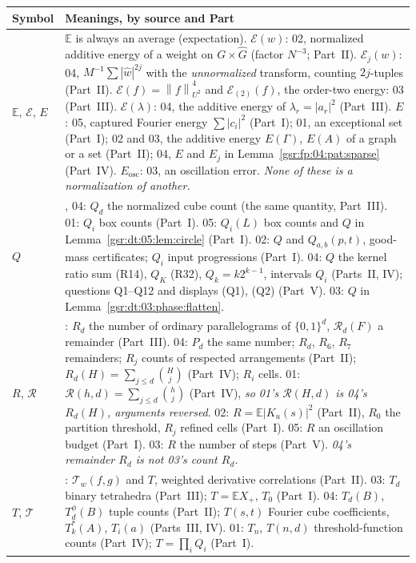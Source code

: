 \documentclass[11pt,letterpaper]{article}
\numberwithin{equation}{section}
\theoremstyle{definition}
\theoremstyle{remark}
\newcommand{\E}{\mathbb E}
\newcommand{\1}{\mathbf 1}
\newcommand{\norm}[1]{\left\|#1\right\|}
\newcommand{\calE}{\mathcal E}
\newcommand{\calT}{\mathcal T}
\begin{document}
\begingroup\small
\renewcommand{\theHtable}{notation.\arabic{table}}
\begin{longtable}{@{}>{\raggedright\arraybackslash}p{} >{\raggedright\arraybackslash}p{}@{}}
\toprule
Symbol & Meanings, by source and Part\\
\midrule
\endhead
$\E$, $\mathcal E$, $E$ & $\E$ is always an average (expectation). $\calE(w)$: 02, normalized additive energy of a weight on $G\times\widehat G$ (factor $N^{-3}$; Part~II). $\mathcal E_j(w)$: 04, $M^{-1}\sum|\widehat w|^{2j}$ with the \emph{unnormalized} transform, counting $2j$-tuples (Part~II). $\mathcal E(f)=\norm f_{U^2}^4$ and $\mathcal E_{(2)}(f)$, the order-two energy: 03 (Part~III). $\mathcal E(\lambda)$: 04, the additive energy of $\lambda_r=|a_r|^2$ (Part~III). $E$: 05, captured Fourier energy $\sum|c_i|^2$ (Part~I); 01, an exceptional set (Part~I); 02 and 03, the additive energy $E(\Gamma)$, $E(A)$ of a graph or a set (Part~II); 04, $E$ and $E_j$ in Lemma~\ref{gsr:fp:04:pat:sparse} (Part~IV). $E_{\mathrm{osc}}$: 03, an oscillation error. \emph{None of these is a normalization of another.}\\
$Q$ & 03, 04: $Q_d$ the normalized cube count (the same quantity, Part~III). 01: $Q_i$ box counts (Part~I). 05: $Q_i(L)$ box counts and $Q$ in Lemma~\ref{gsr:dt:05:lem:circle} (Part~I). 02: $Q$ and $Q_{a,b}(p,t)$, good-mass certificates; $Q_i$ input progressions (Part~I). 04: $Q$ the kernel ratio sum (R14), $Q_K$ (R32), $Q_k=k2^{k-1}$, intervals $Q_i$ (Parts~II, IV); questions Q1--Q12 and displays (Q1), (Q2) (Part~V). 03: $Q$ in Lemma~\ref{gsr:dt:03:phase:flatten}.\\
$R$, $\mathcal R$ & 03: $R_d$ the number of ordinary parallelograms of $\{0,1\}^d$, $\mathcal R_d(F)$ a remainder (Part~III). 04: $P_d$ the same number; $R_d$, $R_6$, $R_7$ remainders; $R_j$ counts of respected arrangements (Part~II); $R_d(H)=\sum_{j\le d}\binom Hj$ (Part~IV); $R_i$ cells. 01: $\mathcal R(h,d)=\sum_{j\le d}\binom hj$ (Part~IV), \emph{so 01's $\mathcal R(H,d)$ is 04's $R_d(H)$, arguments reversed}. 02: $R=\E|K_u(s)|^2$ (Part~II), $R_0$ the partition threshold, $R_j$ refined cells (Part~I). 05: $R$ an oscillation budget (Part~I). 03: $R$ the number of steps (Part~V). \emph{04's remainder $R_d$ is not 03's count $R_d$.}\\
$T$, $\calT$ & 02: $\calT_w(f,g)$ and $T$, weighted derivative correlations (Part~II). 03: $T_d$ binary tetrahedra (Part~III); $T=\E X_+$, $T_0$ (Part~I). 04: $T_d(B)$, $T_d^\phi(B)$ tuple counts (Part~II); $T(s,t)$ Fourier cube coefficients, $T_k^*(A)$, $T_i(a)$ (Parts~III, IV). 01: $T_n$, $T(n,d)$ threshold-function counts (Part~IV); $T=\prod_iQ_i$ (Part~I).\\

\end{longtable}
\end{document}
